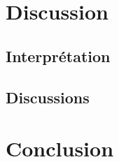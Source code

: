\documentclass[a4paper,12pt,oneside]{article}
\begin{document}
\begin{figure}[h!]
  \begin{center}
  \caption{} \label{fig:}
  \end{center}
\end{figure}

\section{Discussion}%

\subsection{Interprétation}

\subsection{Discussions}
\section{Conclusion}






\begin{thebibliography}{99}
\end{thebibliography}
\end{document}
